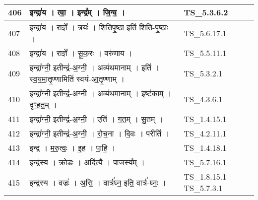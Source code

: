 \documentclass[17pt]{extarticle}
\begin{document}
\begin{longtable}{||p{0.4in}||p{4.9in}||p{0.9in}||}
    \hline
        
    406 & इन्द्रा॑य   ।   त्वा॒   ।   इन्द्र᳚म्   ।   जि॒न्व॒   ।    & TS\_5.3.6.2       \\
    
    \hline
        
    407 & इन्द्रा॑य   ।   राज्ञे᳚   ।   त्रयः॑   ।   शि॒ति॒पृ॒ष्ठा इति॑ शिति{-}पृ॒ष्ठाः   ।    & TS\_5.6.17.1       \\
    
    \hline
        
    408 & इन्द्रा॑य   ।   राज्ञे᳚   ।   सू॒क॒रः   ।   वरु॑णाय   ।    & TS\_5.5.11.1       \\
    
    \hline
        
    409 & इन्द्रा᳚ग्नी॒ इतीन्द्र॑{-}अ॒ग्नी॒   ।   अव्य॑थमानाम्   ।   इति॑   ।   स्व॒य॒मा॒तृ॒ण्णामिति॑ स्वयं{-}आ॒तृ॒ण्णाम्   ।    & TS\_5.3.2.1       \\
    
    \hline
        
    410 & इन्द्रा᳚ग्नी॒ इतीन्द्र॑{-}अ॒ग्नी॒   ।   अव्य॑थमानाम्   ।   इष्ट॑काम्   ।   दृꣳ॒॒ह॒त॒म्   ।    & TS\_4.3.6.1       \\
    
    \hline
        
    411 & इन्द्रा᳚ग्नी॒ इतीन्द्र॑{-}अ॒ग्नी॒   ।   एति॑   ।   ग॒त॒म्   ।   सु॒तम्   ।    & TS\_1.4.15.1       \\
    
    \hline
        
    412 & इन्द्रा᳚ग्नी॒ इतीन्द्र॑{-}अ॒ग्नी॒   ।   रो॒च॒ना   ।   दि॒वः   ।   परीति॑   ।    & TS\_4.2.11.1       \\
    
    \hline
        
    413 & इन्द्र॑   ।   म॒रु॒त्वः॒   ।   इ॒ह   ।   पा॒हि॒   ।    & TS\_1.4.18.1       \\
    
    \hline
        
    414 & इन्द्र॑स्य   ।   क्रो॒डः   ।   अदि॑त्यै   ।   पा॒ज॒स्य᳚म्   ।    & TS\_5.7.16.1       \\
    
    \hline
        
    415 & इन्द्र॑स्य   ।   वज्रः॑   ।   अ॒सि॒   ।   वार्त्र॑घ्न॒ इति॒ वार्त्र॑{-}घ्नः॒   ।    & TS\_1.8.15.1 TS\_5.7.3.1       \\
    
    \hline
        

\end{longtable}
\end{document}
